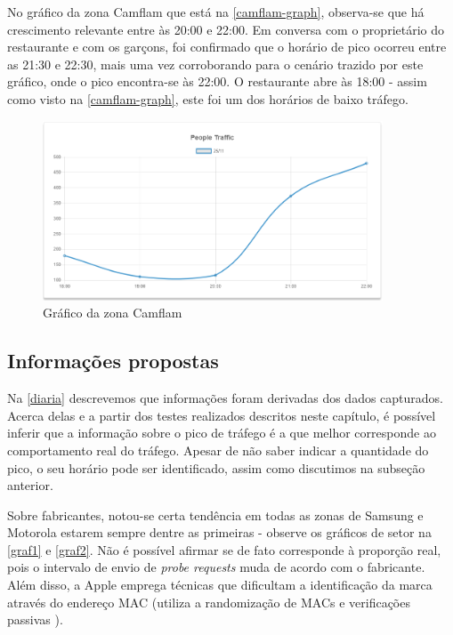 No gráfico da zona Camflam que está na \autoref{camflam-graph}, observa-se que
há crescimento relevante entre às 20:00 e 22:00. Em conversa com o proprietário
do restaurante e com os garçons, foi confirmado que o horário de pico ocorreu
entre as 21:30 e 22:30, mais uma vez corroborando para o cenário trazido por este
gráfico, onde o pico encontra-se às 22:00. O restaurante abre às 18:00 - assim como visto na \autoref{camflam-graph}, este foi um dos horários de baixo tráfego.


\begin{figure}[!h]
  \caption{\label{camflam-graph}Gráfico da zona Camflam}
  \begin{center}
    \includegraphics[width=0.90\textwidth]{img/camflam-graph.png}
  \end{center}
\end{figure}

\subsection{Informações propostas}
Na \autoref{diaria} descrevemos que informações foram derivadas dos dados capturados. Acerca delas e a partir dos testes realizados descritos neste capítulo, é possível inferir que a informação sobre o pico de tráfego é a que melhor corresponde ao comportamento real do tráfego. Apesar de não saber indicar a quantidade do pico, o seu horário pode ser identificado, assim como discutimos na subseção anterior.

Sobre fabricantes, notou-se certa tendência em todas as zonas de Samsung e Motorola estarem
sempre dentre as primeiras - observe os gráficos de setor na \autoref{graf1} e \autoref{graf2}. Não é possível afirmar se de fato corresponde à proporção real, pois o intervalo de envio
de \emph{probe requests} muda de acordo com o fabricante. Além disso, a Apple emprega técnicas que dificultam a identificação da marca através do endereço MAC (utiliza a randomização de MACs e verificações passivas \cite{Apple2016}).

